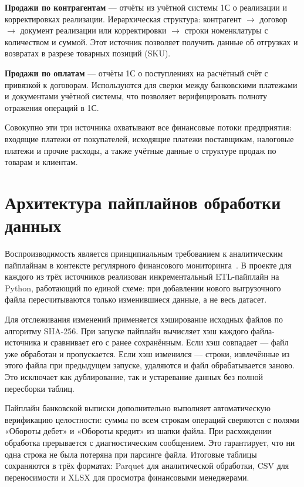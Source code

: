 \textbf{Продажи по контрагентам} --- отчёты из учётной системы 1С о реализации и корректировках реализации. Иерархическая структура: контрагент $\to$ договор $\to$ документ реализации или корректировки $\to$ строки номенклатуры с количеством и суммой. Этот источник позволяет получить данные об отгрузках и возвратах в разрезе товарных позиций (SKU).

\textbf{Продажи по оплатам} --- отчёты 1С о поступлениях на расчётный счёт с привязкой к договорам. Используются для сверки между банковскими платежами и документами учётной системы, что позволяет верифицировать полноту отражения операций в 1С.

Совокупно эти три источника охватывают все финансовые потоки предприятия: входящие платежи от покупателей, исходящие платежи поставщикам, налоговые платежи и прочие расходы, а также учётные данные о структуре продаж по товарам и клиентам.

\section{Архитектура пайплайнов обработки данных}

Воспроизводимость является принципиальным требованием к аналитическим пайплайнам в контексте регулярного финансового мониторинга~\cite{sculley2015hidden}. В проекте для каждого из трёх источников реализован инкрементальный ETL-пайплайн на Python, работающий по единой схеме: при добавлении нового выгрузочного файла пересчитываются только изменившиеся данные, а не весь датасет.

Для отслеживания изменений применяется хэширование исходных файлов по алгоритму SHA-256. При запуске пайплайн вычисляет хэш каждого файла-источника и сравнивает его с ранее сохранённым. Если хэш совпадает --- файл уже обработан и пропускается. Если хэш изменился --- строки, извлечённые из этого файла при предыдущем запуске, удаляются и файл обрабатывается заново. Это исключает как дублирование, так и устаревание данных без полной пересборки таблиц.

Пайплайн банковской выписки дополнительно выполняет автоматическую верификацию целостности: суммы по всем строкам операций сверяются с полями «Обороты дебет» и «Обороты кредит» из шапки файла. При расхождении обработка прерывается с диагностическим сообщением. Это гарантирует, что ни одна строка не была потеряна при парсинге файла. Итоговые таблицы сохраняются в трёх форматах: Parquet для аналитической обработки, CSV для переносимости и XLSX для просмотра финансовыми менеджерами.

